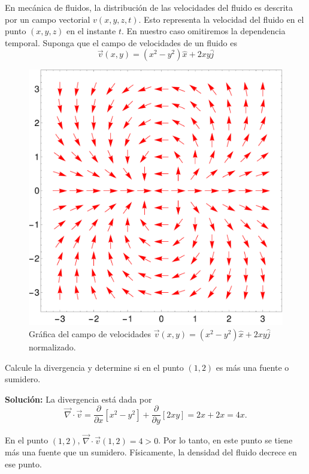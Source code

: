 \begin{ejemplo}
    En mecánica de fluidos, la distribución de las velocidades del fluido es descrita por un campo vectorial $v(x, y, z, t)$. Esto representa la velocidad del fluido en el punto $(x, y, z)$ en el instante $t$. En nuestro caso omitiremos la dependencia temporal. Suponga que el campo de velocidades de un fluido es
    $$\Vec{v}(x,y) = (x^2-y^2) \hat{x} + 2xy \hat{j}$$

    \begin{figure}[H]
    \centering
    \includegraphics[scale = 0.3]{Figuras/Ej-Divergencia}
    \caption{Gráfica del campo de velocidades $\Vec{v}(x,y) = (x^2-y^2) \hat{x} + 2xy \hat{j}$ normalizado.}
    \label{fig:Ej_Divergencia}
    \end{figure}

    Calcule la divergencia y determine si en el punto $(1,2)$ es más una fuente o sumidero.

    \textbf{Solución:} La divergencia está dada por
    $$\vec{\nabla} \cdot \Vec{v} = \frac{\partial}{\partial x}[x^2-y^2] + \frac{\partial}{\partial y}[2xy] = 2x+2x = 4x. $$

    En el punto $(1,2)$, $\vec{\nabla} \cdot \Vec{v}(1,2) = 4 > 0$. Por lo tanto, en este punto se tiene más una fuente que un sumidero. Físicamente, la densidad del fluido decrece en ese punto.
\end{ejemplo}
  

